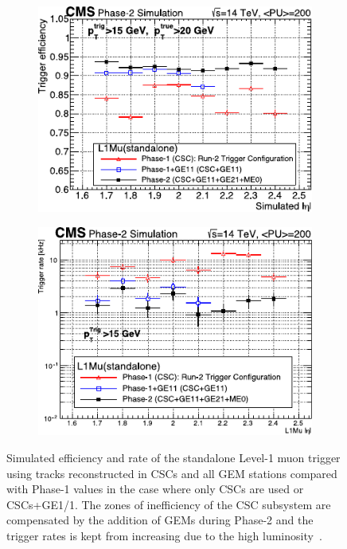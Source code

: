 	\begin{figure}[H]
		\begin{subfigure}{0.5\linewidth}
			\centering
			\includegraphics[width=.9\linewidth]{fig/chapt3/GEM-Trigger-efficiency.pdf}
			\caption{\label{fig:GEM-Muon:A}}
		\end{subfigure}
		\begin{subfigure}{0.5\linewidth}
			\centering
			\includegraphics[width=.9\linewidth]{fig/chapt3/GEM-Trigger-rate.pdf}
			\caption{\label{fig:GEM-Muon:B}}
		\end{subfigure}
		
		\caption{\label{fig:GEM-Trigger} Simulated efficiency and rate of the standalone Level-1 muon trigger using tracks reconstructed in CSCs and all GEM stations compared with Phase-1 values in the case where only CSCs are used or CSCs+GE1/1. The zones of inefficiency of the CSC subsystem are compensated by the addition of GEMs during Phase-2 and the trigger rates is kept from increasing due to the high luminosity~\cite{PHASEIITP}.}
	\end{figure}
	
